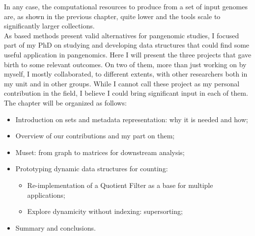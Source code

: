 In any case, the computational resources to produce \ccdbg from a set of input genomes are, as shown in the previous chapter, quite lower and the tools scale to significantly larger collections.\\
As \kmer based methods present valid alternatives for pangenomic studies, I focused part of my PhD on studying and developing data structures that could find some useful application in pangenomics. Here I will present the three projects that gave birth to some relevant outcomes. On two of them, more than just working on by myself, I mostly collaborated, to different extents, with other researchers both in my unit and in other groups. While I cannot call these project as my personal contribution in the field, I believe I could bring significant input in each of them.
The chapter will be organized as follows:
\begin{itemize}
	\item Introduction on \kmer sets and metadata representation: why it is needed and how;
	\item Overview of our contributions and my part on them;
	\item Muset: from graph to matrices for downstream analysis;
	\item Prototyping dynamic data structures for \kmer counting:
	\begin{itemize}
		\item Re-implementation of a Quotient Filter as a base for multiple applications;
		\item Explore dynamicity without indexing: super\kmer sorting;
	\end{itemize}
	\item Summary and conclusions.
\end{itemize}
